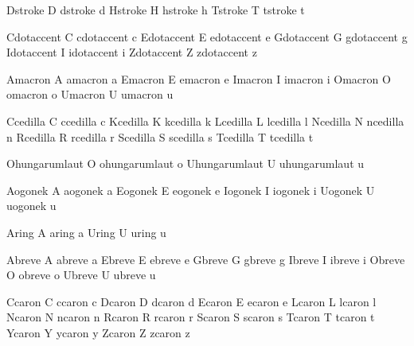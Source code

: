   \inherithandling Dstroke D
  \inherithandling dstroke d
  \inherithandling Hstroke H
  \inherithandling hstroke h
  \inherithandling Tstroke T
  \inherithandling tstroke t

  \inherithandling Cdotaccent C
  \inherithandling cdotaccent c
  \inherithandling Edotaccent E
  \inherithandling edotaccent e
  \inherithandling Gdotaccent G
  \inherithandling gdotaccent g
  \inherithandling Idotaccent I
  \inherithandling idotaccent i
  \inherithandling Zdotaccent Z
  \inherithandling zdotaccent z

  \inherithandling Amacron A
  \inherithandling amacron a
  \inherithandling Emacron E
  \inherithandling emacron e
  \inherithandling Imacron I
  \inherithandling imacron i
  \inherithandling Omacron O
  \inherithandling omacron o
  \inherithandling Umacron U
  \inherithandling umacron u

  \inherithandling Ccedilla C
  \inherithandling ccedilla c
  \inherithandling Kcedilla K
  \inherithandling kcedilla k
  \inherithandling Lcedilla L
  \inherithandling lcedilla l
  \inherithandling Ncedilla N
  \inherithandling ncedilla n
  \inherithandling Rcedilla R
  \inherithandling rcedilla r
  \inherithandling Scedilla S
  \inherithandling scedilla s
  \inherithandling Tcedilla T
  \inherithandling tcedilla t

  \inherithandling Ohungarumlaut O
  \inherithandling ohungarumlaut o
  \inherithandling Uhungarumlaut U
  \inherithandling uhungarumlaut u

  \inherithandling Aogonek A
  \inherithandling aogonek a
  \inherithandling Eogonek E
  \inherithandling eogonek e
  \inherithandling Iogonek I
  \inherithandling iogonek i
  \inherithandling Uogonek U
  \inherithandling uogonek u

  \inherithandling Aring A
  \inherithandling aring a
  \inherithandling Uring U
  \inherithandling uring u

  \inherithandling Abreve A
  \inherithandling abreve a
  \inherithandling Ebreve E
  \inherithandling ebreve e
  \inherithandling Gbreve G
  \inherithandling gbreve g
  \inherithandling Ibreve I
  \inherithandling ibreve i
  \inherithandling Obreve O
  \inherithandling obreve o
  \inherithandling Ubreve U
  \inherithandling ubreve u

  \inherithandling Ccaron C
  \inherithandling ccaron c
  \inherithandling Dcaron D
  \inherithandling dcaron d
  \inherithandling Ecaron E
  \inherithandling ecaron e
  \inherithandling Lcaron L
  \inherithandling lcaron l
  \inherithandling Ncaron N
  \inherithandling ncaron n
  \inherithandling Rcaron R
  \inherithandling rcaron r
  \inherithandling Scaron S
  \inherithandling scaron s
  \inherithandling Tcaron T
  \inherithandling tcaron t
  \inherithandling Ycaron Y
  \inherithandling ycaron y
  \inherithandling Zcaron Z
  \inherithandling zcaron z

